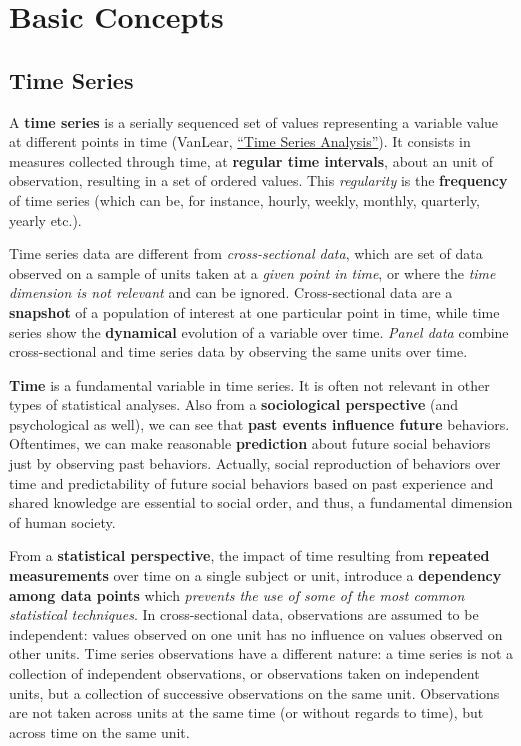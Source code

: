 \documentclass[
]{article}
\begin{document}
\hypertarget{basic-concepts}{%
\section{Basic Concepts}\label{basic-concepts}}

\hypertarget{time-series}{%
\subsection{Time Series}\label{time-series}}

A \textbf{time series} is a serially sequenced set of values representing a variable value at different points in time (VanLear, \href{https://us.sagepub.com/en-us/nam/the-sage-encyclopedia-of-communication-research-methods/book244974}{``Time Series Analysis''}). It consists in measures collected through time, at \textbf{regular time intervals}, about an unit of observation, resulting in a set of ordered values. This \emph{regularity} is the \textbf{frequency} of time series (which can be, for instance, hourly, weekly, monthly, quarterly, yearly etc.).

Time series data are different from \emph{cross-sectional data}, which are set of data observed on a sample of units taken at a \emph{given point in time}, or where the \emph{time dimension is not relevant} and can be ignored. Cross-sectional data are a \textbf{snapshot} of a population of interest at one particular point in time, while time series show the \textbf{dynamical} evolution of a variable over time. \emph{Panel data} combine cross-sectional and time series data by observing the same units over time.

\textbf{Time} is a fundamental variable in time series. It is often not relevant in other types of statistical analyses. Also from a \textbf{sociological perspective} (and psychological as well), we can see that \textbf{past events influence future} behaviors. Oftentimes, we can make reasonable \textbf{prediction} about future social behaviors just by observing past behaviors. Actually, social reproduction of behaviors over time and predictability of future social behaviors based on past experience and shared knowledge are essential to social order, and thus, a fundamental dimension of human society.

From a \textbf{statistical perspective}, the impact of time resulting from \textbf{repeated measurements} over time on a single subject or unit, introduce a \textbf{dependency among data points} which \emph{prevents the use of some of the most common statistical techniques}. In cross-sectional data, observations are assumed to be independent: values observed on one unit has no influence on values observed on other units. Time series observations have a different nature: a time series is not a collection of independent observations, or observations taken on independent units, but a collection of successive observations on the same unit. Observations are not taken across units at the same time (or without regards to time), but across time on the same unit.
\end{document}
